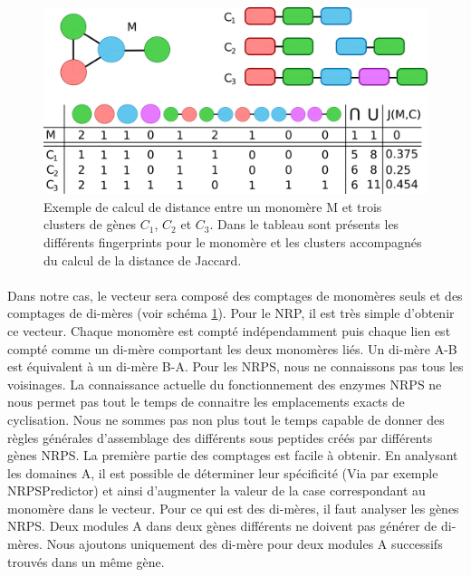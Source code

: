 \documentclass[12pt,french,twoside]{report}
\begin{document}
\begin{figure}[h!]
  \begin{center}
    \includegraphics[width=450px]{Figures/synthese/fingerprints.png}
    \caption{\label{jaccard}Exemple de calcul de distance entre un monomère M et trois clusters de gènes $C_1$, $C_2$ et $C_3$.
    Dans le tableau sont présents les différents fingerprints pour le monomère et les clusters accompagnés du calcul de la distance de Jaccard.}
  \end{center}
\end{figure}

\paragraph{}Dans notre cas, le vecteur sera composé des comptages de monomères seuls et des comptages de di-mères (voir schéma \ref{jaccard}).
Pour le NRP, il est très simple d'obtenir ce vecteur.
Chaque monomère est compté indépendamment puis chaque lien est compté comme un di-mère comportant les deux monomères liés.
Un di-mère A-B est équivalent à un di-mère B-A.
Pour les NRPS, nous ne connaissons pas tous les voisinages.
La connaissance actuelle du fonctionnement des enzymes NRPS ne nous permet pas tout le temps de connaitre les emplacements exacts de cyclisation.
Nous ne sommes pas non plus tout le temps capable de donner des règles générales d'assemblage des différents sous peptides créés par différents gènes NRPS.
La première partie des comptages est facile à obtenir.
En analysant les domaines A, il est possible de déterminer leur spécificité (Via par exemple NRPSPredictor) et ainsi d'augmenter la valeur de la case correspondant au monomère dans le vecteur.
Pour ce qui est des di-mères, il faut analyser les gènes NRPS.
Deux modules A dans deux gènes différents ne doivent pas générer de di-mères.
Nous ajoutons uniquement des di-mère pour deux modules A successifs trouvés dans un même gène.

\end{document}
